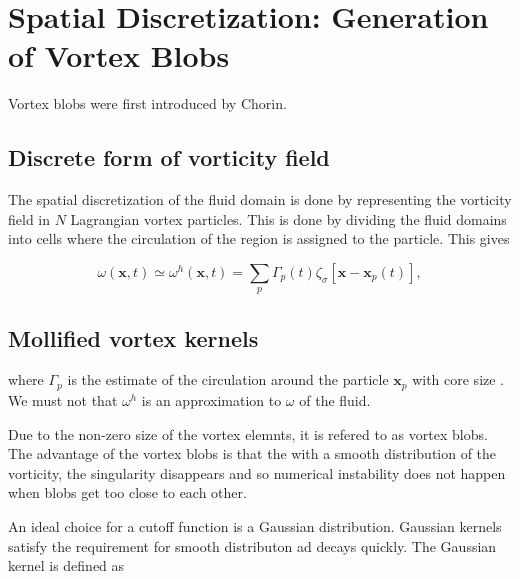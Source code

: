 \section{Spatial Discretization: Generation of Vortex Blobs}

Vortex blobs were first introduced by Chorin.

\subsection{Discrete form of vorticity field}
The spatial discretization of the fluid domain is done by representing the vorticity field in $N$ Lagrangian vortex particles. This is done by dividing the fluid domains into cells where the circulation of the region is assigned to the particle. This gives 

\begin{equation}
\omega\left(\mathbf{x},t\right) \simeq \omega^h\left(\mathbf{x},t\right) = \sum_{p}\Gamma_p\left(t\right)\zeta_{\sigma}\left[\mathbf{x}-\mathbf{x}_p\left(t\right)\right],
\end{equation}

\subsection{Mollified vortex kernels}

where $\Gamma_p$  is the estimate of the circulation around the particle $\mathbf{x}_p$  with core size . We must not that $\omega^h$ is an approximation to $\omega$ of the fluid.

Due to the non-zero size of the vortex elemnts, it is refered to as vortex blobs. The advantage of the vortex blobs is that the with a smooth distribution of the vorticity, the singularity disappears and so numerical instability does not happen when blobs get too close to each other. 

An ideal choice for a cutoff function is a Gaussian distribution. Gaussian kernels satisfy the requirement for smooth distributon ad decays quickly. The Gaussian kernel is defined as

